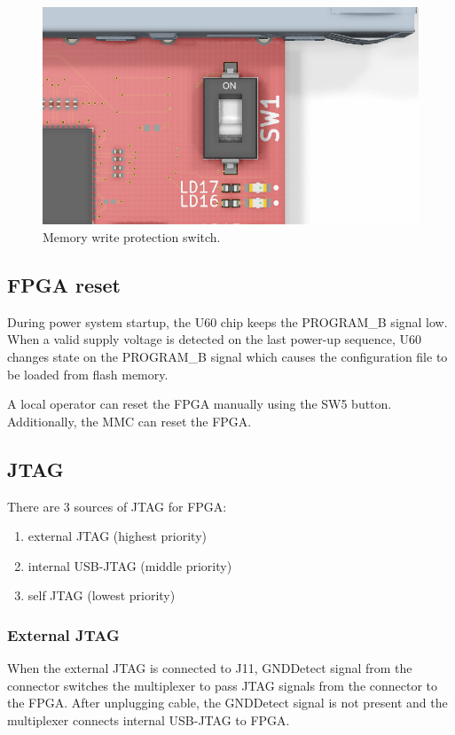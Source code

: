 \documentclass[12pt,oneside,a4]{article}
\begin{document}
\begin{figure}[H]
\begin{center}
\includegraphics[width=0.8\linewidth]{bootsw.png}
 \caption{Memory write protection switch.}\label{bootsw}
\end{center}
\end{figure}

\subsection{FPGA reset}
During power system startup, the U60 chip keeps the PROGRAM\_B signal low. When a valid supply voltage is detected on the last power-up sequence, U60 changes state on the PROGRAM\_B signal which causes the configuration file to be loaded from flash memory.

A local operator can reset the FPGA manually using the SW5 button. Additionally, the MMC can reset the FPGA.

\subsection{JTAG}
There are 3 sources of JTAG for FPGA:
\begin{enumerate}
	\item external JTAG (highest priority)
	\item internal USB-JTAG (middle priority)
	\item self JTAG (lowest priority)
\end{enumerate}

\subsubsection{External JTAG}
When the external JTAG is connected to J11, GNDDetect signal from the connector switches the multiplexer to pass JTAG signals from the connector to the FPGA.  After unplugging cable, the GNDDetect signal is not present and the multiplexer connects internal USB-JTAG to FPGA.
\end{document}
